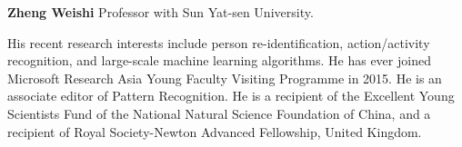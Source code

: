\textbf{Zheng Weishi}  Professor with Sun Yat-sen University.

His recent research interests include person re-identification, action/activity recognition, and large-scale machine learning algorithms.
He has ever joined Microsoft Research Asia Young Faculty Visiting Programme in 2015.
He is an associate editor of Pattern Recognition.
He is a recipient of the Excellent Young Scientists Fund of the National Natural Science Foundation of China,
    and a recipient of Royal Society-Newton Advanced Fellowship, United Kingdom.

